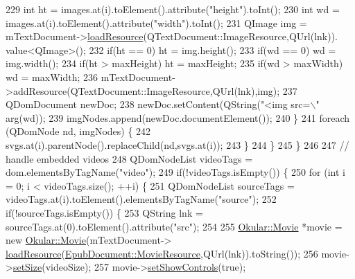\begin{DoxyCode}
229               \textcolor{keywordtype}{int} ht = images.at(i).toElement().attribute(\textcolor{stringliteral}{"height"}).toInt();
230               \textcolor{keywordtype}{int} wd = images.at(i).toElement().attribute(\textcolor{stringliteral}{"width"}).toInt();
231               QImage img = mTextDocument->\hyperlink{classEpub_1_1EpubDocument_a5977d43df31dc940280f6fc80eb6bc75}{loadResource}(QTextDocument::ImageResource,QUrl(lnk)).
      value<QImage>();
232               \textcolor{keywordflow}{if}(ht == 0) ht = img.height();
233               \textcolor{keywordflow}{if}(wd == 0) wd = img.width();
234               \textcolor{keywordflow}{if}(ht > maxHeight) ht = maxHeight;
235               \textcolor{keywordflow}{if}(wd > maxWidth) wd = maxWidth;
236               mTextDocument->addResource(QTextDocument::ImageResource,QUrl(lnk),img);
237               QDomDocument newDoc;
238               newDoc.setContent(QString(\textcolor{stringliteral}{"<img src=\(\backslash\)"%
      arg(wd));
239               imgNodes.append(newDoc.documentElement());
240             \}
241             \textcolor{keywordflow}{foreach} (QDomNode nd, imgNodes) \{
242               svgs.at(i).parentNode().replaceChild(nd,svgs.at(i));
243             \}
244           \}
245         \}
246 
247         \textcolor{comment}{// handle embedded videos}
248         QDomNodeList videoTags = dom.elementsByTagName(\textcolor{stringliteral}{"video"});
249         \textcolor{keywordflow}{if}(!videoTags.isEmpty()) \{
250           \textcolor{keywordflow}{for} (\textcolor{keywordtype}{int} i = 0; i < videoTags.size(); ++i) \{
251             QDomNodeList sourceTags = videoTags.at(i).toElement().elementsByTagName(\textcolor{stringliteral}{"source"});
252             \textcolor{keywordflow}{if}(!sourceTags.isEmpty()) \{
253               QString lnk = sourceTags.at(0).toElement().attribute(\textcolor{stringliteral}{"src"});
254 
255               \hyperlink{classOkular_1_1Movie}{Okular::Movie} *movie = \textcolor{keyword}{new} \hyperlink{classOkular_1_1Movie}{Okular::Movie}(mTextDocument->
      \hyperlink{classEpub_1_1EpubDocument_a5977d43df31dc940280f6fc80eb6bc75}{loadResource}(\hyperlink{classEpub_1_1EpubDocument_a8727955892e8fa3c5eaef8d9d3ae7c8fa75a15290b8e57ccaad8ff2dee9593636}{EpubDocument::MovieResource},QUrl(lnk)).toString());
256               movie->\hyperlink{classOkular_1_1Movie_aaa87050fba266ea14b37b7c9fa458c2f}{setSize}(videoSize);
257               movie->\hyperlink{classOkular_1_1Movie_a72c045992d6fb31a7280e069422e43e5}{setShowControls}(\textcolor{keyword}{true});
}
\end{DoxyCode}
